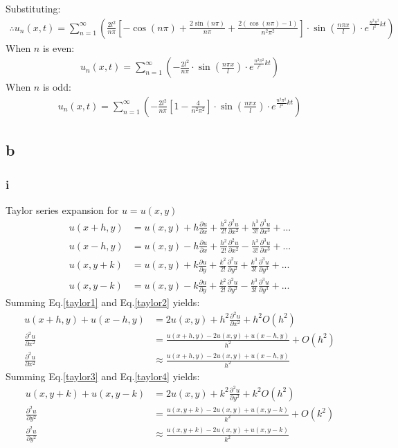 \documentclass[11pt]{article}
\numberwithin{equation}{section}
\begin{document}
Substituting:
\begin{align}
	\therefore u_n \left(x,t\right) = \sum_{n=1}^{\infty} \left(\frac{2l^2}{n\pi}\left[ -\cos\left(n\pi\right) + \frac{2\sin\left(n\pi\right)}{n\pi} +\frac{2\left(\cos\left(n\pi\right)-1\right)}{n^2\pi^2} \right] \cdot \sin\left(\frac{n\pi x}{l}\right) \cdot e^{\frac{n^2\pi^2}{l^2}kt} \right)
\end{align}
When $n$ is even:
\begin{align}
	u_n \left(x,t\right) = \sum_{n=1}^{\infty} \left( -\frac{2l^2}{n\pi} \cdot \sin\left(\frac{n\pi x}{l}\right) \cdot e^{\frac{n^2\pi^2}{l^2}kt} \right)
\end{align}
When $n$ is odd:
\begin{align}
	u_n \left(x,t\right) = \sum_{n=1}^{\infty} \left( -\frac{2l^2}{n\pi}\left[1 - \frac{4}{n^2\pi^2}\right] \cdot \sin\left(\frac{n\pi x}{l}\right) \cdot e^{\frac{n^2\pi^2}{l^2}kt} \right)
\end{align}
\subsection*{b}
\subsubsection*{i}
Taylor series expansion for $u=u(x,y)$
\begin{align}
	u(x+h,y) &= u(x,y) + h \frac{\partial u}{\partial x} + \frac{h^2}{2!} \frac{\partial^2 u}{\partial x^2} + \frac{h^3}{3!} \frac{\partial^3 u}{\partial x^3} + ... \label{taylor1}\\
	u(x-h,y) &= u(x,y) -h\frac{\partial u}{\partial x} + \frac{h^2}{2!}\frac{\partial^2 u}{\partial x^2} - \frac{h^3}{3!} \frac{\partial^3 u}{\partial x^3} + ... \label{taylor2}\\
	u(x,y+k) &= u(x,y) + k \frac{\partial u}{\partial y} + \frac{k^2}{2!} \frac{\partial^2 u}{\partial y^2} + \frac{k^3}{3!} \frac{\partial^3 u}{\partial y^3} + ... \label{taylor3}\\
	u(x,y-k) &= u(x,y) -k\frac{\partial u}{\partial y} + \frac{k^2}{2!}\frac{\partial^2 u}{\partial y^2} - \frac{k^3}{3!} \frac{\partial^3 u}{\partial y^3} + ... \label{taylor4}
\end{align}
Summing Eq.\ref{taylor1} and Eq.\ref{taylor2} yields:
\begin{align}
	u(x+h,y) + u(x-h,y) &= 2u(x,y) +h^2\frac{\partial^2 u}{\partial x^2} + h^2O(h^2)\\
	\frac{\partial^2 u}{\partial x^2} &= \frac{u(x+h,y)-2u(x,y)+u(x-h,y)}{h^2} + O(h^2)\\
	\frac{\partial^2 u}{\partial x^2} &\approx \frac{u(x+h,y)-2u(x,y)+u(x-h,y)}{h^2}
\end{align}
Summing Eq.\ref{taylor3} and Eq.\ref{taylor4} yields:
\begin{align}
	u(x,y+k) + u(x,y-k) &= 2u(x,y) +k^2\frac{\partial^2 u}{\partial y^2} + k^2O(h^2)\\
	\frac{\partial^2 u}{\partial y^2} &= \frac{u(x,y+k)-2u(x,y)+u(x,y-k)}{k^2} + O(k^2)\\
	\frac{\partial^2 u}{\partial y^2} &\approx \frac{u(x,y+k)-2u(x,y)+u(x,y-k)}{k^2}
\end{align}
\end{document}
